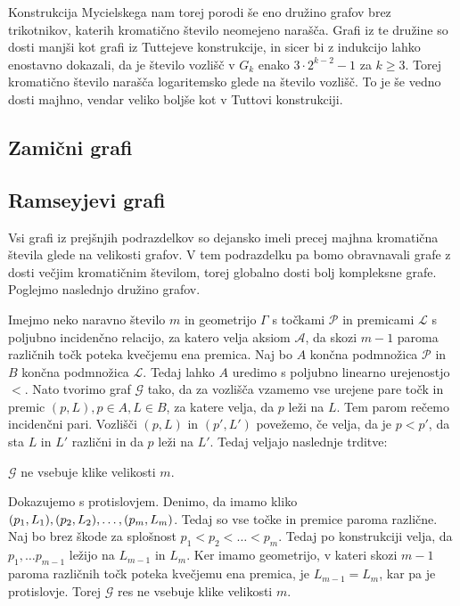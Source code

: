 \documentclass[mat1, tisk]{fmfdelo}
\begin{document}
Konstrukcija Mycielskega nam torej porodi še eno družino grafov brez trikotnikov, katerih kromatično število neomejeno narašča. Grafi iz te družine so dosti manjši kot grafi iz Tuttejeve konstrukcije,
in sicer bi z indukcijo lahko enostavno dokazali, da je število vozlišč v $G_k$ enako $3 \cdot 2^{k-2} - 1$ za $k \geq 3$. Torej kromatično število narašča logaritemsko glede na število vozlišč. To je še vedno dosti
majhno, vendar veliko boljše kot v Tuttovi konstrukciji.

\subsection{Zamični grafi}

\subsection{Ramseyjevi grafi}
Vsi grafi iz prejšnjih podrazdelkov so dejansko imeli precej majhna kromatična števila glede na velikosti grafov. V tem podrazdelku pa bomo obravnavali grafe z dosti večjim kromatičnim številom,
torej globalno dosti bolj kompleksne grafe. Poglejmo naslednjo družino grafov.

Imejmo neko naravno število $m$ in geometrijo $\Gamma$ s točkami $\mathcal{P}$ in premicami $\mathcal{L}$ s poljubno incidenčno relacijo, za katero velja aksiom $\mathcal{A}$, da skozi $m-1$ paroma različnih točk poteka kvečjemu ena premica. Naj bo $A$ končna podmnožica $\mathcal{P}$ in
$B$ končna podmnožica $\mathcal{L}$. Tedaj lahko $A$ uredimo s poljubno linearno urejenostjo $<$. Nato tvorimo graf $\mathcal{G}$ tako, da za vozlišča vzamemo vse urejene pare točk in premic $(p, L), p \in A, L \in B$, za katere velja,
da $p$ leži na $L$. Tem parom rečemo incidenčni pari. Vozlišči $(p, L)$ in $(p', L')$ povežemo, če velja, da je $p < p'$, da sta $L$ in $L'$ različni in da $p$ leži na $L'$. Tedaj veljajo naslednje trditve:

    \begin{trditev}
        $\mathcal{G}$ ne vsebuje klike velikosti $m$.
    \end{trditev}

    \begin{dokaz}
        Dokazujemo s protislovjem. Denimo, da imamo kliko $(p_1, L_1), (p_2, L_2), \ldots,\\ (p_m, L_m)$. Tedaj so vse točke in premice paroma različne. Naj bo brez škode za splošnost $p_1 < p_2 < \ldots < p_m$. Tedaj po konstrukciji
        velja, da $p_1, \ldots p_{m-1}$ ležijo na $L_{m-1}$ in $L_m$. Ker imamo geometrijo, v kateri skozi $m-1$ paroma različnih točk poteka kvečjemu ena premica, je $L_{m-1} = L_m$, kar pa je protislovje. Torej $\mathcal{G}$ res ne vsebuje klike velikosti $m$.
    \end{dokaz}
\end{document}
